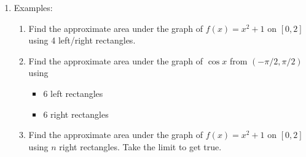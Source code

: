 \documentclass{article}
\begin{document}
\begin{enumerate}
\item {Examples:}
\begin{enumerate}
\item Find the approximate area under the graph of $f(x)=x^2+1$ on $[0,2]$ using 4 left/right rectangles. 
\item Find the approximate area under the graph of $\cos x$ from $(-\pi/2,\pi/2)$ using 
\begin{itemize}
\item 6 left rectangles
\item 6 right rectangles
\end{itemize}
\item Find the approximate area under the graph of $f(x)=x^2+1$ on $[0,2]$ using $n$ right rectangles. Take the limit to get true.
\end{enumerate}
\end{enumerate}


\end{document}
